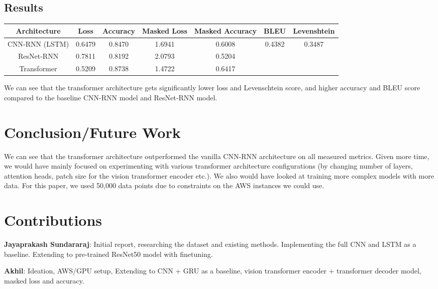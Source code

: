 \documentclass{article}
\begin{document}
\subsection{Results}
\begin{center}
\begin{tabular}{||c | c | c | c | c | c | c ||} 
 \hline
 Architecture & Loss & Accuracy & Masked Loss & Masked Accuracy & BLEU & Levenshtein \\ [0.5ex] 
 \hline\hline
 CNN-RNN (LSTM) & 0.6479 & 0.8470 & 1.6941 & 0.6008 & 0.4382 & 0.3487 \\ 
 \hline
ResNet-RNN  & 0.7811  & 0.8192 & 2.0793  & 0.5204 \\ 
 \hline
Transformer  & 0.5209 & 0.8738 & 1.4722 & 0.6417 \\
 \hline
\end{tabular}
\end{center}

We can see that the transformer architecture gets significantly lower loss and Levenschtein score, and higher accuracy and BLEU score compared to the baseline CNN-RNN model and ResNet-RNN model.

\section{Conclusion/Future Work}
We can see that the transformer architecture outperformed the vanilla CNN-RNN architecture on all measured metrics. Given more time, we would have mainly focused on experimenting with various transformer architecture configurations (by changing number of layers, attention heads, patch size for the vision transformer encoder etc.). We also would have looked at training more complex models with more data. For this paper, we used 50,000 data points due to constraints on the AWS instances we could use.

\section{Contributions}

\textbf{Jayaprakash Sundararaj}: Initial report, researching the dataset and existing methods. Implementing the full CNN and LSTM as a baseline. Extending to pre-trained ResNet50 model with finetuning.

\textbf{Akhil}: Ideation, AWS/GPU setup, Extending to CNN + GRU as a baseline, vision transformer encoder + transformer decoder model, masked loss and accuracy.
\end{document}
